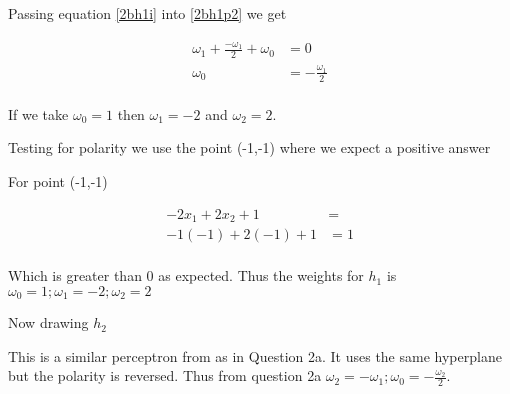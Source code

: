 \documentclass[10pt,a4paper]{article}
\begin{document}
Passing equation \ref{2bh1i} into \ref{2bh1p2} we get

\begin{equation}
\begin{split}
\omega_1 + \frac{-\omega_1}{2} + \omega_0 &= 0 \\
\omega_0 &= -\frac{\omega_1}{2}\\
\end{split}
\end{equation}

If we take $\omega_0 = 1$ then $\omega_1 = -2$ and $\omega_2 = 2$.

Testing for polarity we use the point (-1,-1) where we expect a positive answer 

For point (-1,-1)

\begin{equation}
\begin{split}
-2x_1+2x_2 + 1 &=\\
-1(-1) + 2(-1) + 1& = 1\\
\end{split}
\end{equation}

Which is greater than 0 as expected. Thus the weights for $h_1$ is $\omega_0 = 1; \omega_1 = -2; \omega_2 = 2$ 

Now drawing $h_2$

\begin{center}
\end{center}

This is a similar perceptron from as in Question 2a. It uses the same hyperplane but the polarity is reversed. Thus from question 2a $\omega_2 = -\omega_1; \omega_0 = -\frac{\omega_2}{2}$. 
\end{document}
